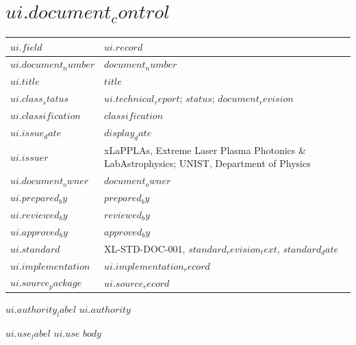 \documentclass{xlapplas-doc-review}
\begin{document}
\section*{$ui.document_control$}
\begin{longtable}{@{}p{53.33mm}p{111.67mm}@{}}
\toprule
$ui.field$ & $ui.record$ \\
\midrule
$ui.document_number$ & \texttt{$document_number$} \\
$ui.title$ & $title$ \\
$ui.class_status$ & $ui.technical_report$; $status$; $document_revision$ \\
$ui.classification$ & $classification$ \\
$ui.issue_date$ & $display_date$ \\
$ui.issuer$ & xLaPPLAs, Extreme Laser Plasma Photonics \& LabAstrophysics; UNIST, Department of Physics \\
$ui.document_owner$ & $document_owner$ \\
$ui.prepared_by$ & $prepared_by$ \\
$ui.reviewed_by$ & $reviewed_by$ \\
$ui.approved_by$ & $approved_by$ \\
$ui.standard$ & XL-STD-DOC-001, $standard_revision_text$, $standard_date$ \\
$ui.implementation$ & $ui.implementation_record$ \\
$ui.source_package$ & $ui.source_record$ \\
\bottomrule
\end{longtable}
\textbf{$ui.authority_label$} $ui.authority$
\par\textbf{$ui.use_label$} $ui.use$
\clearpage
{}
\tableofcontents
\clearpage
$body$
\end{document}
